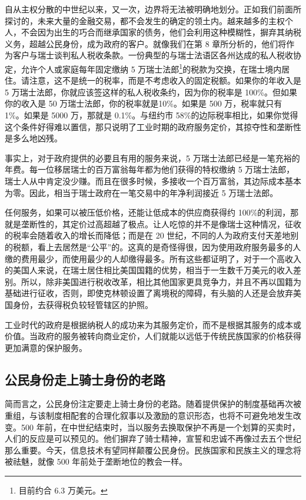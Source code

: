 自从主权分散的中世纪以来，又一次，边界将无法被明确地划分。正如我们前面所探讨的，未来大量的金融交易，都不会发生的确定的领土内。越来越多的主权个人，不会因为出生的巧合而继承国家的债务，他们会利用这种模糊性，摒弃其纳税义务，超越公民身份，成为政府的客户。就像我们在第 8 章所分析的，他们将作为客户与瑞士谈判私人税收条款。一份典型的与瑞士法语区各州达成的私人税收协定，允许个人或家庭每年固定缴纳 5 万瑞士法郎\footnote{目前约合 6.3 万美元。}的税款为交换，在瑞士境内居住。请注意，这不是统一的税率，而是不考虑收入的固定税额。如果你的年收入是 5 万瑞士法郎，你就应该签这样的私人税收条约，因为你的税率是 100\%。但如果你的收入是 50 万瑞士法郎，你的税率就是10\%。如果是 500 万，税率就只有 1\%。如果是 5000 万，那就是 0.1\%。与纽约市 58\%的边际税率相比，如果你觉得这个条件好得难以置信，那只说明了工业时期的政府服务定价，其掠夺性和垄断性是多么地凶残。

事实上，对于政府提供的必要且有用的服务来说，5 万瑞士法郎已经是一笔充裕的年费。每一位移居瑞士的百万富翁每年都为他们获得的特权缴纳 5 万瑞士法郎，瑞士人从中肯定没少赚。而且在很多时候，多接收一个百万富翁，其边际成本基本为零。因此，相当于瑞士政府在一笔交易中的年净利润接近 5 万瑞士法郎。

任何服务，如果可以被压低价格，还能让低成本的供应商获得约 100\%的利润，那就是垄断性的，其定价过高超越了极点。让人吃惊的并不是像瑞士这种情况，征收的税率会随着收入的增长而降低；而是在 20 世纪，不同的人为政府支付天差地别的税额，看上去居然是“公平”的。这真的是奇怪得很，因为使用政府服务最多的人缴的费用最少，而使用最少的人却缴得最多。所有这些都证明了，对于一个高收入的美国人来说，在瑞士居住相比美国国籍的优势，相当于一生数千万美元的收入差别。所以，除非美国进行税收改革，相比其他国家更具竞争力，并且不再以国籍为基础进行征收，否则，即使克林顿设置了离境税的障碍，有头脑的人还是会放弃美国身份，去获得税负较轻管辖区的护照。

工业时代的政府是根据纳税人的成功来为其服务定价，而不是根据其服务的成本或价值。当政府的服务被转向商业定价，人们就能以远低于传统民族国家的价格获得更加满意的保护服务。

\subsection{公民身份走上骑士身份的老路}
简而言之，公民身份注定要走上骑士身份的老路。随着提供保护的制度基础再次被重组，与该制度相配套的合理化叙事以及激励的意识形态，也将不可避免地发生改变。500 年前，在中世纪结束时，当以服务去换取保护不再是一个划算的买卖时，人们的反应是可以预见的。他们摒弃了骑士精神，宣誓和忠诚不再像过去五个世纪那么重要。今天，信息技术有望同样颠覆公民身份。民族国家和民族主义的理念将被祛魅，就像 500 年前处于垄断地位的教会一样。

